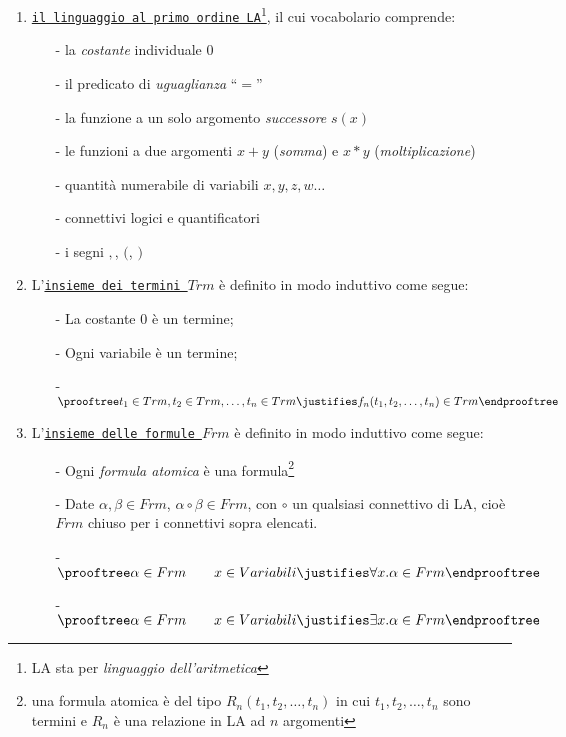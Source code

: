 \begin{enumerate}
 \item \underline{\texttt{il linguaggio al primo ordine LA}}\footnote{LA sta per \textsl{linguaggio dell'aritmetica}}, il cui vocabolario comprende:
\begin{itemize}
	\item [-] la \textsl{costante} individuale $0$
	\item[-] il predicato di \textsl{uguaglianza} "`$=$"' 
	\item[-] la funzione a un solo argomento \textsl{successore} $s(x)$
	\item[-] le funzioni a due argomenti $x+y$ (\textsl{somma}) e $x*y$ (\textsl{moltiplicazione})	
	\item[-] quantit\`a numerabile di variabili $x, y, z, w\ldots$
	\item[-] connettivi logici e quantificatori
	\item[-] i segni $,$, $($, $)$
\end{itemize}
\vspace{.5cm}
\item L'\underline{\texttt{insieme dei termini $Trm$}} \`e definito in modo induttivo come segue:
\begin{itemize}
\item[-] La costante $0$ \`e un termine;
\item[-] Ogni variabile \`e un termine;
\vspace{0.3 cm}
\item[-] 
	$\prooftree
  t_1\in Trm ,t_2\in Trm,\dots,t_n\in Trm
   \justifies
f_n(t_1,t_2,\dots,t_n) \in Trm
\endprooftree$ 
\end{itemize}
\vspace{.5cm}
\item  L'\underline{\texttt{insieme delle formule $Frm$}} \`e definito in modo induttivo come segue:
\begin{itemize}
\item[-] Ogni \textit{formula atomica} \`e una formula\footnote{una formula atomica \`e del tipo $R_n(t_1,t_2,\dots,t_n)$ in cui $t_1,t_2,\dots, t_n$ sono termini e $R_n$ \`e una relazione in LA ad $n$ argomenti}
\item[-] Date $\alpha,\beta \in Frm$, $\alpha \circ \beta \in Frm$, con $\circ$ un qualsiasi connettivo di LA, cio\`e $Frm$  chiuso per i connettivi sopra elencati.
\item[-] 
	$\prooftree
  \alpha \in Frm \qquad x \in Variabili
   \justifies
\forall x.\alpha \in Frm
\endprooftree$ 
\vspace{0.3 cm}
\item[-] 
$\prooftree
  \alpha \in Frm \qquad x \in Variabili
   \justifies
\exists x.\alpha \in Frm
\endprooftree$ 


\end{itemize}
\end{enumerate}
